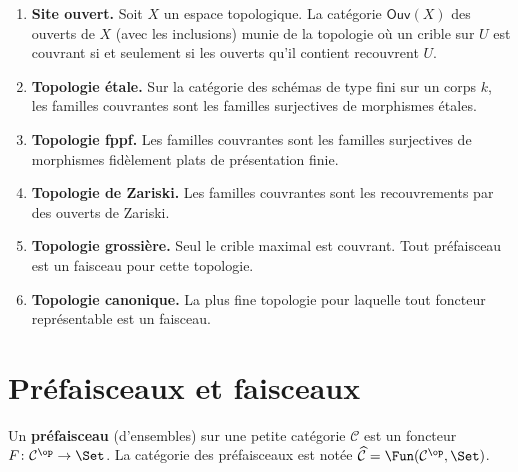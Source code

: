 \begin{exemple}\label{ex:sites}
\begin{enumerate}[label=(\roman*)]
\item \textbf{Site ouvert.}
      Soit $X$ un espace topologique.
      La catégorie $\mathsf{Ouv}(X)$ des ouverts de $X$
      (avec les inclusions) munie de la topologie où un crible
      sur $U$ est couvrant si et seulement si les ouverts qu'il
      contient recouvrent $U$.

\item \textbf{Topologie étale.}
      Sur la catégorie des schémas de type fini sur un corps $k$,
      les familles couvrantes sont les familles surjectives de
      morphismes étales.

\item \textbf{Topologie fppf.}
      Les familles couvrantes sont les familles surjectives de
      morphismes fidèlement plats de présentation finie.

\item \textbf{Topologie de Zariski.}
      Les familles couvrantes sont les recouvrements par des
      ouverts de Zariski.

\item \textbf{Topologie grossière.}
      Seul le crible maximal est couvrant.  Tout préfaisceau est
      un faisceau pour cette topologie.

\item \textbf{Topologie canonique.}
      La plus fine topologie pour laquelle tout foncteur
      représentable est un faisceau.
\end{enumerate}
\end{exemple}

\section{Préfaisceaux et faisceaux}\label{sec:faisceaux-site}

\begin{definition}[Préfaisceau]\label{def:prefaisceau-site}
Un \textbf{préfaisceau} (d'ensembles) sur une petite catégorie
$\mathcal{C}$ est un foncteur $F \colon \mathcal{C}^\op \to \Set$.
La catégorie des préfaisceaux est notée
$\widehat{\mathcal{C}} = \Fun(\mathcal{C}^\op, \Set)$.
\end{definition}


